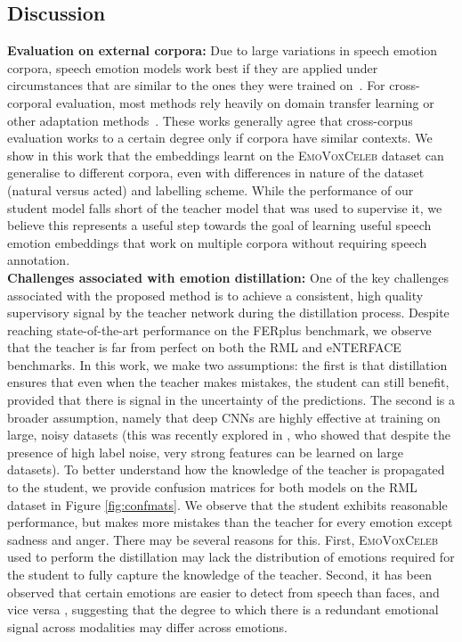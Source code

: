 \documentclass[sigconf]{acmart}
\newcommand{\datasetName}{\textsc{EmoVoxCeleb}}
\begin{document}
\subsection{Discussion} \label{sec:discuss}
\noindent\textbf{Evaluation on external corpora:} 
Due to large variations in speech emotion corpora, speech emotion models work best if they are applied under circumstances that are
similar to the ones they were trained on~\cite{schuller2010cross}. For cross-corporal evaluation, most methods rely heavily on domain transfer learning or other
adaptation methods~\cite{zhang2011unsupervised,deng2014autoencoder,deng2014linked}. These works generally agree that cross-corpus evaluation works to a certain degree only if corpora
have similar contexts. We show in this work that the embeddings learnt on the \datasetName{} dataset can generalise to different corpora, even with differences in nature of the dataset (natural versus acted) and labelling scheme. While the performance of our student model falls short of the teacher model that was used to supervise it, we believe this represents a useful step towards the goal of learning useful speech emotion embeddings that work on multiple corpora without requiring speech annotation.\\
\noindent\textbf{Challenges associated with emotion distillation:}
One of the key challenges associated with the proposed method is to achieve a consistent, high quality supervisory signal by the teacher network during the distillation process.  Despite reaching state-of-the-art performance on the FERplus benchmark, we observe that the teacher is far from perfect on both the RML and eNTERFACE benchmarks.  In this work, we make two assumptions: the first is that distillation ensures that even when the teacher makes mistakes, the student can still benefit, provided that there is signal in the uncertainty of the predictions. The second is a broader assumption, namely that deep CNNs are highly effective at training on large, noisy datasets (this was recently explored in \cite{rolnick2017deep,mahajan2018exploring}, who showed that despite the presence of high label noise, very strong features can be learned on large datasets). To better understand how the knowledge of the teacher is propagated to the student, we provide confusion matrices for both models on the RML dataset in Figure \ref{fig:confmats}. We observe that the student exhibits reasonable performance, but makes more mistakes than the teacher for every emotion except sadness and anger.  There may be several reasons for this.  First, \datasetName{} used to perform the distillation may lack the distribution of emotions required for the student to fully capture the knowledge of the teacher.  Second, it has been observed that certain emotions are easier to detect from speech than faces, and vice versa \cite{busso2004analysis}, suggesting that the degree to which there is a redundant emotional signal across modalities may differ across emotions.   \\
\end{document}
